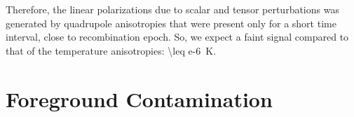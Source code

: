 Therefore, the linear polarizations due to scalar and tensor perturbations was
generated by quadrupole anisotropies that were present only for a short time
interval, close to recombination epoch. So, we expect a faint signal compared to
that of the temperature anisotropies: \SI{\leq e-6}{\kelvin}.

\section{Foreground Contamination}
